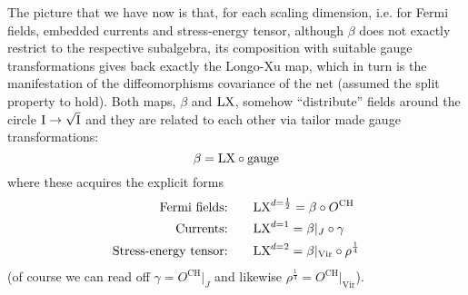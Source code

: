  \bigskip
 \begin{figure}[htbp]
 \centering
 \def\radius{1.05}
 \def\rad{0.95}
 \def\out{1.15}
 \end{figure}
 The picture that we have now is that, for each scaling dimension,
 i.e. for Fermi fields, embedded currents and stress-energy tensor,
 although $\beta$ does not exactly restrict to the respective subalgebra,
 its composition with suitable gauge transformations gives back exactly
 the Longo-Xu map, which in turn is the manifestation of the
 diffeomorphisms covariance of the net (assumed the split property
 to hold). Both maps, $\beta$ and $\textrm{LX}$, somehow ``distribute'' fields
 around the circle $\textrm{I}\to\sqrt{\textrm{I}}$ and they are related to each other via 
 tailor made gauge transformations:
 \[
 \beta=\textrm{LX}\circ\text{gauge}
 \]
 where these acquires the explicit forms
 \begin{align*}
 \text{Fermi fields:}&\qquad\textrm{LX}^{d=\frac{1}{2}}=
 \beta\circ O^{\text{CH}}\\
 \text{Currents:}&\qquad\textrm{LX}^{d=1}=\beta|_J\circ\gamma\\
 \text{Stress-energy tensor:}&\qquad\textrm{LX}^{d=2}=
 \beta|_{\text{Vir}}\circ\rho^{\frac{1}{4}}
 \end{align*}
 (of course we can read off $\gamma=O^{\text{CH}}|_J$ and
 likewise $\rho^{\frac{1}{4}}=O^{\text{CH}}|_{\text{Vir}}$).
 
